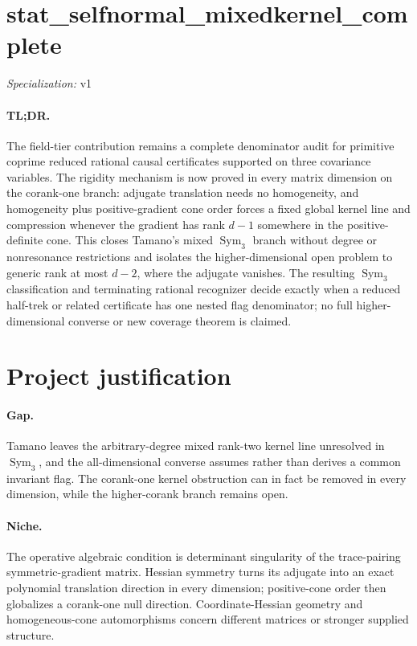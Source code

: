 \documentclass{article}
\begin{document}
\sloppy

\section*{stat\_\allowbreak{}selfnormal\_\allowbreak{}mixedkernel\_\allowbreak{}complete}

\noindent\textit{Specialization:} v1\par

\paragraph{TL;DR.} The field-tier contribution remains a complete denominator audit for primitive coprime reduced rational causal certificates supported on three covariance variables. The rigidity mechanism is now proved in every matrix dimension on the corank-one branch: adjugate translation needs no homogeneity, and homogeneity plus positive-gradient cone order forces a fixed global kernel line and compression whenever the gradient has rank \(d-1\) somewhere in the positive-definite cone. This closes Tamano's mixed \(\operatorname{Sym}_3\) branch without degree or nonresonance restrictions and isolates the higher-dimensional open problem to generic rank at most \(d-2\), where the adjugate vanishes. The resulting \(\operatorname{Sym}_3\) classification and terminating rational recognizer decide exactly when a reduced half-trek or related certificate has one nested flag denominator; no full higher-dimensional converse or new coverage theorem is claimed.

\section{Project justification}

\paragraph{Gap.} Tamano leaves the arbitrary-degree mixed rank-two kernel line unresolved in \(\operatorname{Sym}_3\), and the all-dimensional converse assumes rather than derives a common invariant flag. The corank-one kernel obstruction can in fact be removed in every dimension, while the higher-corank branch remains open.

\paragraph{Niche.} The operative algebraic condition is determinant singularity of the trace-pairing symmetric-gradient matrix. Hessian symmetry turns its adjugate into an exact polynomial translation direction in every dimension; positive-cone order then globalizes a corank-one null direction. Coordinate-Hessian geometry and homogeneous-cone automorphisms concern different matrices or stronger supplied structure.
\end{document}

